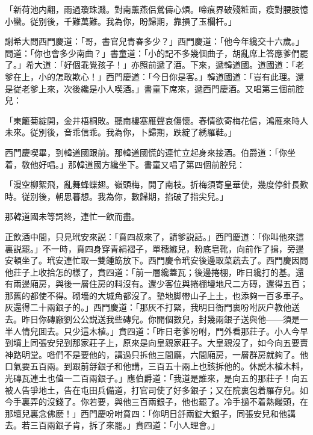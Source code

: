 \begin{myquote}
「新荷池内翻，雨過瓊珠濺。對南薰燕侣鶯儔心煩。啼痕界破殘粧面，瘦對腰肢憶小蠻。従别後，千難萬難。我為你，盼歸期，靠損了玉欄杆。」
\end{myquote}

謝希大問西門慶道：「哥，書官兒青春多少？」西門慶道：「他今年纔交十六歲。」問道：「你也會多少南曲？」書童道：「小的記不多幾個曲子，胡亂席上答應爹們罷了。」希大道：「好個乖覺孩子！」亦照前遞了酒。下來，遞韓道國。道國道：「老爹在上，小的怎敢欺心！」西門慶道：「今日你是客。」韓道國道：「豈有此理。還是従老爹上來，次後纔是小人喫酒。」書童下席來，遞西門慶酒。又唱第三個前腔兒：

\begin{myquote}
「東籬菊綻開，金井梧桐敗。聽南樓塞雁聲哀傷懷。春情欲寄梅花信，鴻雁來時人未來。従別後，音乖信乖。我為你，卜歸期，跌綻了綉羅鞋。」
\end{myquote}

西門慶喫畢，到韓道國跟前。那韓道國慌的連忙立起身來接酒。伯爵道：「你坐着，敎他好唱。」那韓道國方纔坐下。書童又唱了第四個前腔兒：

\begin{myquote}
「漫空柳絮飛，亂舞蜂蝶翅。嶺頭梅，開了南枝。折梅須寄皇華使，幾度停針長歎時。従別後，朝思暮想。我為你，數歸期，掐破了指尖兒。」
\end{myquote}

那韓道國未等詞終，連忙一飲而盡。

正飲酒中間，只見玳安來説：「賁四叔來了，請爹説話。」西門慶道：「你叫他來這裏説罷。」不一時，賁四身穿青絹褶子，單穗縧兒，粉底皂靴，向前作了揖，旁邊安頓坐了。玳安連忙取一雙鍾筯放下。西門慶令玳安後邊取菜蔬去了。西門慶因問他莊子上收拾怎的樣了，賁四道：「前一層纔蓋瓦；後邊捲棚，昨日纔打的基。還有兩邊廂房，與後一層住房的料沒有。還少客位與捲棚墁地尺二方磚，還得五百；那舊的都使不得。砌墻的大城角都沒了。墊地脚帶山子上土，也添夠一百多車子。灰還得二十兩銀子的。」西門慶道：「那灰不打緊，我明日衙門裏吩咐灰户教他送去。昨日你磚廠劉公公説送我些磚兒。你開個數兒，封幾兩銀子送與他——須是一半人情兒囬去。只少這木植。」賁四道：「昨日老爹吩咐，門外看那莊子。小人今早到墳上同張安兒到那家莊子上，原來是向皇親家莊子。大皇親沒了，如今向五要賣神路明堂。喒們不是要他的，講過只拆他三間廳，六間廂房，一層群房就夠了。他口氣要五百兩。到跟前㧱銀子和他講，三百五十兩上也該拆他的。休説木植木料，光磚瓦連土也值一二百兩銀子。」應伯爵道：「我道是誰來，是向五的那莊子！向五被人告爭地土，告在屯田兵備道，打官司使了好多銀子；又在院裏包着羅存兒。如今手裏弄的沒錢了。你若要，與他三百兩銀子，他也罷了。冷手撾不着熱饅頭，在那壇兒裏念佛麽！」西門慶吩咐賁四：「你明日㧱兩錠大銀子，同張安兒和他講去。若三百兩銀子肯，拆了來罷。」賁四道：「小人理會。」

